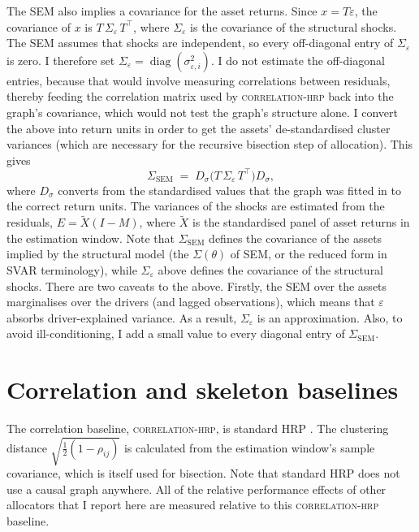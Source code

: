 \documentclass[11pt, a4paper]{report}
\newcommand{\corrhrp}{\textsc{correlation-hrp}}
\begin{document}
The SEM also implies a covariance for the asset returns. Since
$x = T\varepsilon$, the covariance of $x$ is $T\,\Sigma_\varepsilon\,T^\top$,
where $\Sigma_\varepsilon$ is the covariance of the structural shocks.
The SEM assumes that shocks are independent, so every off-diagonal
entry of $\Sigma_\varepsilon$ is zero. I therefore set
$\Sigma_\varepsilon = \operatorname{diag}(\sigma^2_{\varepsilon,i})$.
I do not estimate the off-diagonal entries, because that would involve measuring correlations between residuals, thereby feeding the correlation matrix used by \corrhrp{} back into the graph's covariance, which would not test the graph's structure alone.
I convert the above into return units in order to get the assets' de-standardised cluster variances (which are necessary for the recursive bisection step of allocation). This gives
\begin{equation}
\Sigma_{\mathrm{SEM}}   \;=\; D_\sigma \big( T\, \Sigma_\varepsilon\,
T^\top \big) D_\sigma ,   \label{eq:sigma-sem} \end{equation} 
where $D_\sigma$ converts from the standardised values that the graph was fitted in to the correct return units. 
The variances of the shocks are estimated from the residuals, $E = \tilde{X} (I - M)$, where $\tilde{X}$ is the standardised panel of asset returns in the estimation window.
Note that $\Sigma_{\mathrm{SEM}}$ defines the covariance of the assets implied by the structural model (the $\Sigma(\theta)$ of SEM, or the reduced
form in SVAR terminology), while $\Sigma_\varepsilon$ above defines the covariance of the structural shocks.
There are two caveats to the above. Firstly, the SEM over the assets marginalises over the drivers (and lagged observations), which means that $\varepsilon$ absorbs driver-explained variance. As a result, $\Sigma_\varepsilon$ is an approximation.
Also, to avoid ill-conditioning, I add a small value to every diagonal entry of $\Sigma_{\mathrm{SEM}}$.

\section{Correlation and skeleton baselines}
\label{sec:baselines}

The correlation baseline, \corrhrp{}, is standard HRP \cite{lopezdeprado2016hrp}.
The clustering distance $\sqrt{\tfrac{1}{2}(1-\rho_{ij})}$ is calculated from the estimation window's sample covariance, which is itself used for bisection. 
Note that standard HRP does not use a causal graph anywhere. All of the relative performance effects of other allocators that I report here are measured relative to this \corrhrp{} baseline.
\end{document}
